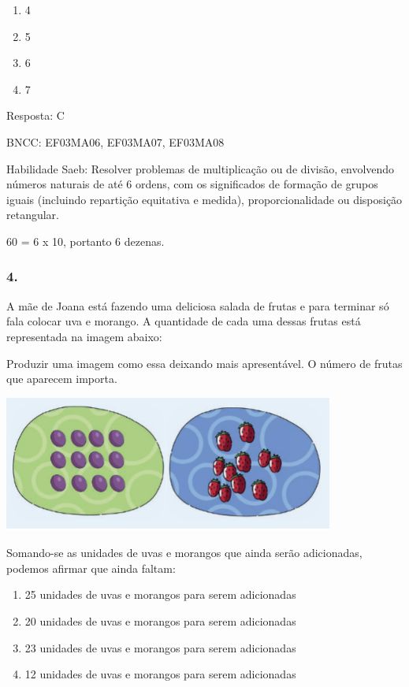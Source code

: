 \begin{enumerate}
\def\labelenumi{\alph{enumi})}
\item
  4
\item
  5
\item
  6
\item
  7
\end{enumerate}

Resposta: C

BNCC: EF03MA06, EF03MA07, EF03MA08

Habilidade Saeb: Resolver problemas de multiplicação ou de divisão,
envolvendo números naturais de até 6 ordens, com os significados de
formação de grupos iguais (incluindo repartição equitativa e medida),
proporcionalidade ou disposição retangular.

60 = 6 x 10, portanto 6 dezenas.

\subsubsection{4.}\label{section-174}

A mãe de Joana está fazendo uma deliciosa salada de frutas e para
terminar só fala colocar uva e morango. A quantidade de cada uma dessas
frutas está representada na imagem abaixo:

Produzir uma imagem como essa deixando mais apresentável. O número de
frutas que aparecem importa.

\includegraphics[width=4.26704in,height=1.75849in]{media/image132.png}

Somando-se as unidades de uvas e morangos que ainda serão adicionadas,
podemos afirmar que ainda faltam:

\begin{enumerate}
\def\labelenumi{\alph{enumi})}
\item
  25 unidades de uvas e morangos para serem adicionadas
\item
  20 unidades de uvas e morangos para serem adicionadas
\item
  23 unidades de uvas e morangos para serem adicionadas
\item
  12 unidades de uvas e morangos para serem adicionadas
\end{enumerate}

